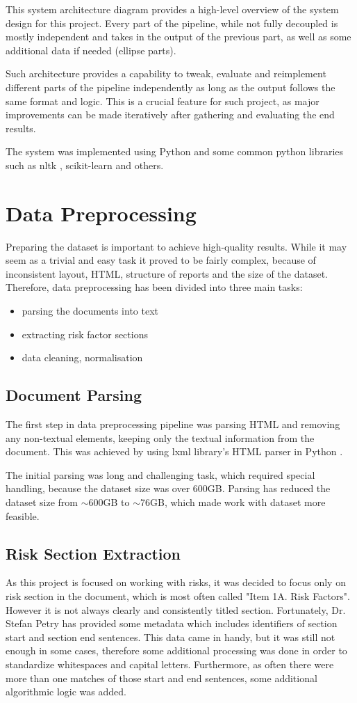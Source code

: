 This system architecture diagram provides a high-level overview of the system design for this project. Every part of the pipeline, while not fully decoupled is mostly independent and takes in the output of the previous part, as well as some additional data if needed (ellipse parts).

Such architecture provides a capability to tweak, evaluate and reimplement different parts of the pipeline independently as long as the output follows the same format and logic. This is a crucial feature for such project, as major improvements can be made iteratively after gathering and evaluating the end results.

The system was implemented using Python and some common python libraries such as nltk \cite{nltkhome}, scikit-learn \cite{sklearnhome} and others.

\section{Data Preprocessing}
Preparing the dataset is important to achieve high-quality results. While it may seem as a trivial and easy task it proved to be fairly complex, because of inconsistent layout, HTML, structure of reports and the size of the dataset. Therefore, data preprocessing has been divided into three main tasks:
\begin{itemize}
\item parsing the documents into text
\item extracting risk factor sections
\item data cleaning, normalisation
\end{itemize}

\subsection{Document Parsing}
The first step in data preprocessing pipeline was parsing HTML and removing any non-textual elements, keeping only the textual information from the document. This was achieved by using lxml library's HTML parser in Python \cite{lxmlhtml}.

The initial parsing was long and challenging task, which required special handling, because the dataset size was over 600GB. Parsing has reduced the dataset size from $\sim$600GB to $\sim$76GB, which made work with dataset more feasible.

\subsection{Risk Section Extraction}
As this project is focused on working with risks, it was decided to focus only on risk section in the document, which is most often called "Item 1A. Risk Factors". However it is not always clearly and consistently titled section. Fortunately, Dr. Stefan Petry has provided some metadata which includes identifiers of section start and section end sentences. This data came in handy, but it was still not enough in some cases, therefore some additional processing was done in order to standardize whitespaces and capital letters. Furthermore, as often there were more than one matches of those start and end sentences, some additional algorithmic logic was added.

